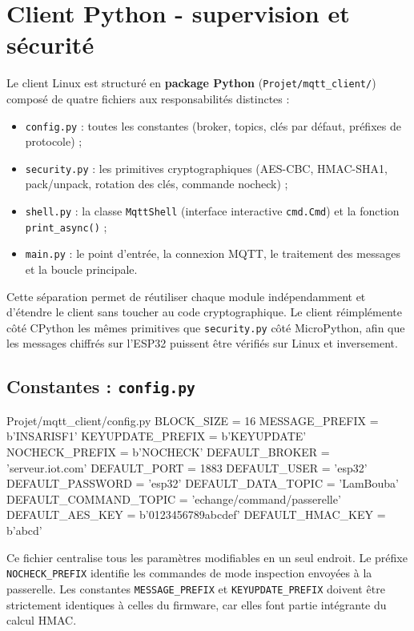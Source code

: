 \documentclass[a4paper,11pt]{report}
\begin{document}
\chapter{Client Python - supervision et sécurité}
\label{chap:client}

Le client Linux est structuré en \textbf{package Python} (\texttt{Projet/mqtt\_client/}) composé de
quatre fichiers aux responsabilités distinctes :
\begin{itemize}
    \item \texttt{config.py} : toutes les constantes (broker, topics, clés par défaut, préfixes de protocole) ;
    \item \texttt{security.py} : les primitives cryptographiques (AES-CBC, HMAC-SHA1, pack/unpack, rotation des clés, commande nocheck) ;
    \item \texttt{shell.py} : la classe \texttt{MqttShell} (interface interactive \texttt{cmd.Cmd}) et la fonction \texttt{print\_async()} ;
    \item \texttt{main.py} : le point d'entrée, la connexion MQTT, le traitement des messages et la boucle principale.
\end{itemize}

Cette séparation permet de réutiliser chaque module indépendamment et d'étendre le client sans toucher au
code cryptographique. Le client réimplémente côté CPython les mêmes primitives que \texttt{security.py}
côté MicroPython, afin que les messages chiffrés sur l'ESP32 puissent être vérifiés sur Linux et inversement.

\section{Constantes : \texttt{config.py}}

\begin{pycode}{Projet/mqtt\_client/config.py}
BLOCK_SIZE = 16
MESSAGE_PREFIX = b'INSARISF1'
KEYUPDATE_PREFIX = b'KEYUPDATE'
NOCHECK_PREFIX = b'NOCHECK'
DEFAULT_BROKER = 'serveur.iot.com'
DEFAULT_PORT = 1883
DEFAULT_USER = 'esp32'
DEFAULT_PASSWORD = 'esp32'
DEFAULT_DATA_TOPIC = 'LamBouba'
DEFAULT_COMMAND_TOPIC = 'echange/command/passerelle'
DEFAULT_AES_KEY = b'0123456789abcdef'
DEFAULT_HMAC_KEY = b'abcd'
\end{pycode}

Ce fichier centralise tous les paramètres modifiables en un seul endroit. Le préfixe \texttt{NOCHECK\_PREFIX}
identifie les commandes de mode inspection envoyées à la passerelle. Les constantes \texttt{MESSAGE\_PREFIX}
et \texttt{KEYUPDATE\_PREFIX} doivent être strictement identiques à celles du firmware, car elles font
partie intégrante du calcul HMAC.
\end{document}
